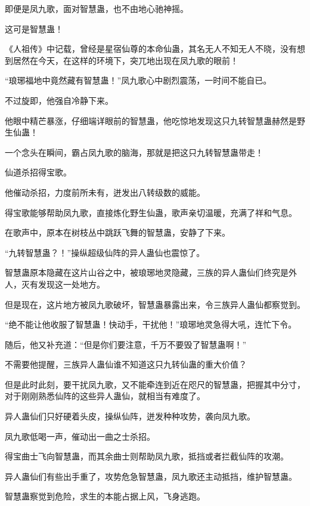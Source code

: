 
\begin{this_body}

即便是凤九歌，面对智慧蛊，也不由地心驰神摇。

这可是智慧蛊！

《人祖传》中记载，曾经是星宿仙尊的本命仙蛊，其名无人不知无人不晓，没有想到居然在今天，在这样的环境下，突兀地出现在凤九歌的眼前！

“琅琊福地中竟然藏有智慧蛊！”凤九歌心中剧烈震荡，一时间不能自已。

不过旋即，他强自冷静下来。

他眼中精芒暴涨，仔细端详眼前的智慧蛊，他吃惊地发现这只九转智慧蛊赫然是野生仙蛊！

一个念头在瞬间，霸占凤九歌的脑海，那就是把这只九转智慧蛊带走！

仙道杀招得宝歌。

他催动杀招，力度前所未有，迸发出八转级数的威能。

得宝歌能够帮助凤九歌，直接炼化野生仙蛊，歌声亲切温暖，充满了祥和气息。

在歌声中，原本在树枝丛中跳跃飞舞的智慧蛊，安静了下来。

“九转智慧蛊？！”操纵超级仙阵的异人蛊仙也震惊了。

智慧蛊原本隐藏在这片山谷之中，被琅琊地灵隐藏，三族的异人蛊仙们终究是外人，灭有发现这一处地方。

但是现在，这片地方被凤九歌破坏，智慧蛊暴露出来，令三族异人蛊仙都察觉到。

“绝不能让他收服了智慧蛊！快动手，干扰他！”琅琊地灵急得大吼，连忙下令。

随后，他又补充道：“但是你们要注意，千万不要毁了智慧蛊啊！”

不需要他提醒，三族异人蛊仙谁不知道这只九转仙蛊的重大价值？

但是此时此刻，要干扰凤九歌，又不能牵连到近在咫尺的智慧蛊，把握其中分寸，对于刚刚熟悉仙阵的这些异人蛊仙，就相当有难度了。

异人蛊仙们只好硬着头皮，操纵仙阵，迸发种种攻势，袭向凤九歌。

凤九歌低喝一声，催动出一曲之士杀招。

得宝曲士飞向智慧蛊，而其余曲士则帮助凤九歌，抵挡或者拦截仙阵的攻潮。

异人蛊仙们有些出手重了，攻势危急智慧蛊，凤九歌还主动抵挡，维护智慧蛊。

智慧蛊察觉到危险，求生的本能占据上风，飞身逃跑。


\end{this_body}
